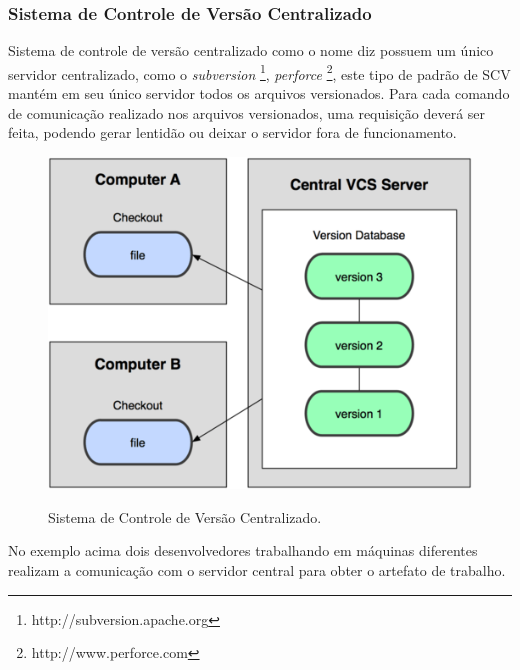 \subsubsection{Sistema de Controle de Versão Centralizado} Sistema de controle de versão centralizado como o nome diz possuem um único servidor centralizado, como o \textit{subversion} \footnote{http://subversion.apache.org}, \textit{perforce} \footnote{http://www.perforce.com}, este tipo de padrão de SCV mantém em seu único servidor todos os arquivos versionados. Para cada comando de comunicação realizado nos arquivos versionados, uma requisição deverá ser feita, podendo gerar lentidão ou deixar o servidor fora de funcionamento.
\begin{figure}[h]
\centering
\caption[Sistema de Controle de Versão Centralizado]{Sistema de Controle de Versão Centralizado.}
\includegraphics[width=0.7\linewidth]{./images/scvcentral}
\label{fig:SCVCentral}
\end{figure}
No exemplo acima dois desenvolvedores trabalhando em máquinas diferentes realizam a comunicação com o servidor central para obter o artefato de trabalho.	
